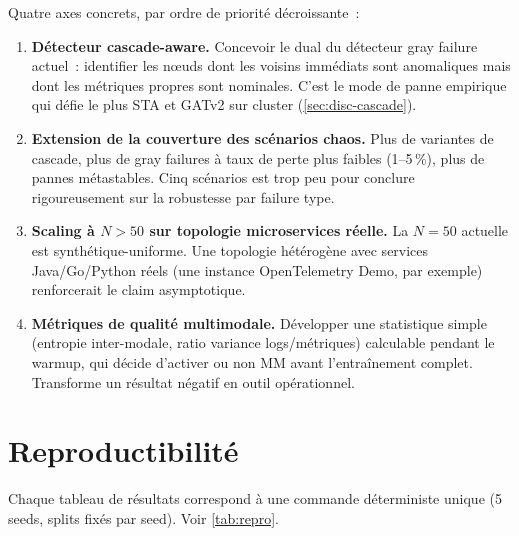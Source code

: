 \documentclass[a4paper,11pt,oneside]{report}
\begin{document}
Quatre axes concrets, par ordre de priorit\'e d\'ecroissante~:

\begin{enumerate}
  \item \textbf{D\'etecteur cascade-aware.} Concevoir le dual du d\'etecteur gray failure actuel~: identifier les nœuds dont les voisins imm\'ediats sont anomaliques mais dont les m\'etriques propres sont nominales. C'est le mode de panne empirique qui d\'efie le plus STA et GATv2 sur cluster (\cref{sec:disc-cascade}).
  \item \textbf{Extension de la couverture des sc\'enarios chaos.} Plus de variantes de cascade, plus de gray failures \`a taux de perte plus faibles (1--5\,\%), plus de pannes m\'etastables. Cinq sc\'enarios est trop peu pour conclure rigoureusement sur la robustesse par failure type.
  \item \textbf{Scaling \`a $N > 50$ sur topologie microservices r\'eelle.} La $N{=}50$ actuelle est synth\'etique-uniforme. Une topologie h\'et\'erog\`ene avec services Java/Go/Python r\'eels (une instance OpenTelemetry Demo, par exemple) renforcerait le claim asymptotique.
  \item \textbf{M\'etriques de qualit\'e multimodale.} D\'evelopper une statistique simple (entropie inter-modale, ratio variance logs/m\'etriques) calculable pendant le warmup, qui d\'ecide d'activer ou non MM avant l'entra\^inement complet. Transforme un r\'esultat n\'egatif en outil op\'erationnel.
\end{enumerate}

\cleardoublepage
\printbibliography[heading=bibintoc,title={Bibliographie}]

\appendix
\renewcommand{\chaptername}{Annexe}

\chapter{Reproductibilit\'e}
\label{ann:reproductibilite}

Chaque tableau de r\'esultats correspond \`a une commande d\'eterministe unique (5 seeds, splits fix\'es par seed). Voir \cref{tab:repro}.
\end{document}

